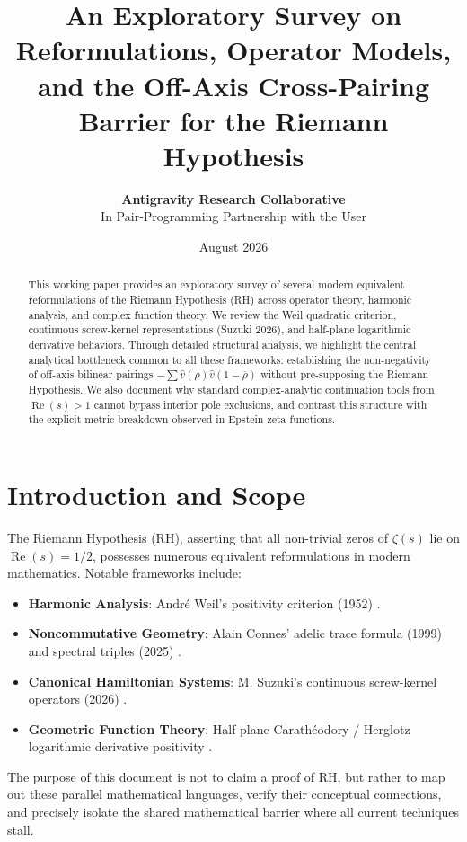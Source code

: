 \documentclass[12pt, a4paper]{article}
\title{\textbf{An Exploratory Survey on Reformulations, Operator Models, and the Off-Axis Cross-Pairing Barrier for the Riemann Hypothesis}}
\author{\textbf{Antigravity Research Collaborative} \\ \small In Pair-Programming Partnership with the User}
\date{August 2026}
\begin{document}
\maketitle

\begin{abstract}
This working paper provides an exploratory survey of several modern equivalent reformulations of the Riemann Hypothesis (RH) across operator theory, harmonic analysis, and complex function theory. We review the Weil quadratic criterion, continuous screw-kernel representations (Suzuki 2026), and half-plane logarithmic derivative behaviors. Through detailed structural analysis, we highlight the central analytical bottleneck common to all these frameworks: establishing the non-negativity of off-axis bilinear pairings $-\sum \widehat{v}(\rho)\overline{\widehat{v}(1-\overline{\rho})}$ without pre-supposing the Riemann Hypothesis. We also document why standard complex-analytic continuation tools from $\operatorname{Re}(s) > 1$ cannot bypass interior pole exclusions, and contrast this structure with the explicit metric breakdown observed in Epstein zeta functions.
\end{abstract}

\tableofcontents

\section{Introduction and Scope}
The Riemann Hypothesis (RH), asserting that all non-trivial zeros of $\zeta(s)$ lie on $\operatorname{Re}(s) = 1/2$, possesses numerous equivalent reformulations in modern mathematics. Notable frameworks include:
\begin{itemize}
    \item \textbf{Harmonic Analysis}: André Weil's positivity criterion (1952) \cite{Weil1952}.
    \item \textbf{Noncommutative Geometry}: Alain Connes' adelic trace formula (1999) \cite{Connes1999} and spectral triples (2025) \cite{CCM2025}.
    \item \textbf{Canonical Hamiltonian Systems}: M. Suzuki's continuous screw-kernel operators (2026) \cite{Suzuki2026}.
    \item \textbf{Geometric Function Theory}: Half-plane Carath\'eodory / Herglotz logarithmic derivative positivity \cite{deBranges1968}.
\end{itemize}

The purpose of this document is not to claim a proof of RH, but rather to map out these parallel mathematical languages, verify their conceptual connections, and precisely isolate the shared mathematical barrier where all current techniques stall.
\end{document}

